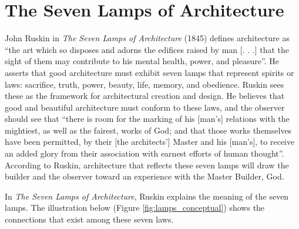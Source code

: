 \section{The Seven Lamps of Architecture}

John Ruskin in \textit{The Seven Lamps of Architecture} (1845) defines
architecture as ``the art which so disposes and adorns the edifices
raised by man [. . .] that the sight of them may contribute to his
mental health, power, and pleasure''\citep[][pg. 8]{ruskin1920}.  He asserts that
good architecture must exhibit seven lamps that represent spirits or
laws: sacrifice, truth, power, beauty, life, memory, and obedience. 
Ruskin sees these as the framework for architectural creation and
design.  He believes that good and beautiful architecture must conform
to these laws, and the observer should see that ``there is room for the
marking of his [man’s] relations with the mightiest, as well as the
fairest, works of God; and that those works themselves have been
permitted, by their [the architects’] Master and his [man’s], to
receive an added glory from their association with earnest efforts of
human thought''\citep[][pg. 73]{ruskin1920}.  According to Ruskin, architecture that reflects
these seven lamps will draw the builder and the observer toward an
experience with the Master Builder, God.  

In \textit{The Seven Lamps of Architecture}, Ruskin explains the
meaning of the seven lamps.  The illustration below (Figure \ref{fig:lamps_conceptual}) shows the
connections that exist among these seven laws.\citep[][pg. 402]{baljon1997}

